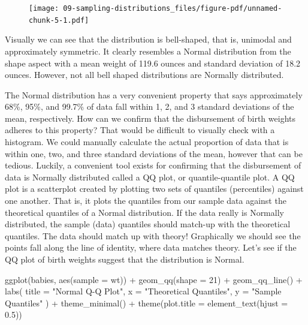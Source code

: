 \documentclass[
  letterpaper,
  DIV=11,
  numbers=noendperiod]{scrreprt}
\newenvironment{Shaded}{\begin{snugshade}}{\end{snugshade}}
\newcommand{\AttributeTok}[1]{\textcolor[rgb]{0.40,0.45,0.13}{#1}}
\newcommand{\DecValTok}[1]{\textcolor[rgb]{0.68,0.00,0.00}{#1}}
\newcommand{\FloatTok}[1]{\textcolor[rgb]{0.68,0.00,0.00}{#1}}
\newcommand{\FunctionTok}[1]{\textcolor[rgb]{0.28,0.35,0.67}{#1}}
\newcommand{\NormalTok}[1]{\textcolor[rgb]{0.00,0.23,0.31}{#1}}
\newcommand{\SpecialCharTok}[1]{\textcolor[rgb]{0.37,0.37,0.37}{#1}}
\newcommand{\StringTok}[1]{\textcolor[rgb]{0.13,0.47,0.30}{#1}}
\theoremstyle{definition}
\theoremstyle{remark}
\begin{document}
\begin{figure}[H]

{\centering \texttt{[image: 09-sampling-distributions\_files/figure-pdf/unnamed-chunk-5-1.pdf]}

}

\end{figure}

Visually we can see that the distribution is bell-shaped, that is,
unimodal and approximately symmetric. It clearly resembles a Normal
distribution from the shape aspect with a mean weight of 119.6 ounces
and standard deviation of 18.2 ounces. However, not all bell shaped
distributions are Normally distributed.

The Normal distribution has a very convenient property that says
approximately 68\%, 95\%, and 99.7\% of data fall within 1, 2, and 3
standard deviations of the mean, respectively. How can we confirm that
the disbursement of birth weights adheres to this property? That would
be difficult to visually check with a histogram. We could manually
calculate the actual proportion of data that is within one, two, and
three standard deviations of the mean, however that can be tedious.
Luckily, a convenient tool exists for confirming that the disbursement
of data is Normally distributed called a QQ plot, or quantile-quantile
plot. A QQ plot is a scatterplot created by plotting two sets of
quantiles (percentiles) against one another. That is, it plots the
quantiles from our sample data against the theoretical quantiles of a
Normal distribution. If the data really is Normally distributed, the
sample (data) quantiles should match-up with the theoretical quantiles.
The data should match up with theory! Graphically we should see the
points fall along the line of identity, where data matches theory. Let's
see if the QQ plot of birth weights suggest that the distribution is
Normal.

\begin{Shaded}
\begin{Highlighting}[]
\FunctionTok{ggplot}\NormalTok{(babies, }\FunctionTok{aes}\NormalTok{(}\AttributeTok{sample =}\NormalTok{ wt)) }\SpecialCharTok{+}
  \FunctionTok{geom\_qq}\NormalTok{(}\AttributeTok{shape =} \DecValTok{21}\NormalTok{) }\SpecialCharTok{+}
  \FunctionTok{geom\_qq\_line}\NormalTok{() }\SpecialCharTok{+}
  \FunctionTok{labs}\NormalTok{(}
    \AttributeTok{title =} \StringTok{"Normal Q{-}Q Plot"}\NormalTok{, }
    \AttributeTok{x =} \StringTok{"Theoretical Quantiles"}\NormalTok{,}
    \AttributeTok{y =} \StringTok{"Sample Quantiles"}
\NormalTok{    ) }\SpecialCharTok{+}
  \FunctionTok{theme\_minimal}\NormalTok{() }\SpecialCharTok{+}
  \FunctionTok{theme}\NormalTok{(}\AttributeTok{plot.title =} \FunctionTok{element\_text}\NormalTok{(}\AttributeTok{hjust =} \FloatTok{0.5}\NormalTok{))}
\end{Highlighting}
\end{Shaded}
\end{document}

